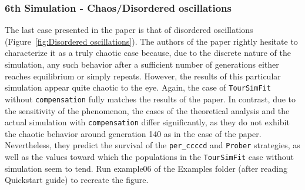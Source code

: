 \documentclass[12pt]{article}
\begin{document}
\subsubsection{6th Simulation - Chaos/Disordered oscillations}
The last case presented in the paper is that of disordered oscillations (Figure~\ref{fig:Disordered oscillations}). The authors of the paper rightly hesitate to characterize it as a truly chaotic case because, due to the discrete nature of the simulation, any such behavior after a sufficient number of generations either reaches equilibrium or simply repeats. However, the results of this particular simulation appear quite chaotic to the eye. Again, the case of \texttt{TourSimFit} without \texttt{compensation} fully matches the results of the paper. In contrast, due to the sensitivity of the phenomenon, the cases of the theoretical analysis and the actual simulation with \texttt{compensation} differ significantly, as they do not exhibit the chaotic behavior around generation 140 as in the case of the paper. Nevertheless, they predict the survival of the \texttt{per\_ccccd} and \texttt{Prober} strategies, as well as the values toward which the populations in the \texttt{TourSimFit} case without simulation seem to tend. Run example06 of the Examples folder (after reading Quickstart guide) to recreate the figure.
\end{document}
